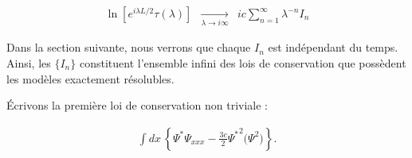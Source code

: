 \begin{eqnarray}
	\ln \left [ e^{i \lambda L /2 } \tau ( \lambda ) \right ]  & \underset{ \lambda \to i \infty }{ \longrightarrow}& ic \sum_{n = 1 }^\infty \lambda^{-n} I_n  	
\end{eqnarray}

Dans la section suivante, nous verrons que chaque \( I_n \) est indépendant du temps. Ainsi, les \( \{ I_n \} \) constituent l'ensemble infini des lois de conservation que possèdent les modèles exactement résolubles.

Écrivons la première loi de conservation non triviale : 

\begin{eqnarray}
	\int dx \, \left \{  \Psi^\ast \Psi_{xxx} - \frac{3c}{2} {\Psi^\ast}^2 \Big ( \Psi^2  \Big ) \right \} .	
\end{eqnarray}






